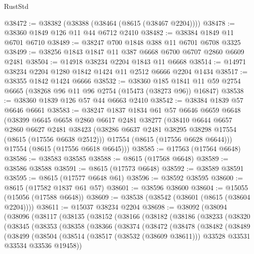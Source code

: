 \begin{lexlean}{RustStd}
\begin{coremodule}
@38472 := @38382 (@38388 (@38464 (@8615 (@38467 @2204))))
@38478 := @38360 @1849 @126 @11 @44 @6712 @2410
@38482 := @38384 @1849 @11 @6701 @6710
@38489 := @38247 @700 @1848 @388 @11 @6701 @6708 @3325
@38499 := @38256 @1843 @1847 @11 @387 @6668 @6700 @6707 @2860 @6609 @2481
@38504 := @14918 @38234 @2204 @1843 @11 @6668
@38514 := @14971 @38234 @2204 @1280 @1842 @1424 @11 @2512 @6666 @2204 @1434
@38517 := @38355 @1842 @1424 @6666
@38532 := @38360
    @185
    @1841
    @11
    @59
    @2754
    @6665
    (@38268 @96 @11 @96 @2754 (@15473 (@38273 @96)) @16847)
@38538 := @38360 @1839 @126 @57 @44 @6663 @2410
@38542 := @38384 @1839 @57 @6646 @6661
@38583 := @38247
    @1837
    @1834
    @61
    @57
    @6646
    @6659
    @6648
    (@38399
      @6645
      @6658
      @2860
      @6617
      @2481
      @38277
      (@38410
        @6644
        @6657
        @2860
        @6627
        @2481
        @38423
        (@38286 @6637 @2481 @38295 @38298 @17554 (@8615 (@17556 @6638 @2512)))
        @17554
        (@8615 (@17556 @6628 @6644)))
      @17554
      (@8615 (@17556 @6618 @6645)))
@38585 := @17563 (@17564 @6648)
@38586 := @38583 @38585
@38588 := @8615 (@17568 @6648)
@38589 := @38586 @38588
@38591 := @8615 (@17573 @6648)
@38592 := @38589 @38591
@38595 := @8615 (@17577 @6648 @61)
@38596 := @38592 @38595
@38600 := @8615 (@17582 @1837 @61 @57)
@38601 := @38596 @38600
@38604 := @15055 (@15056 (@17588 @6648))
@38609 := @38538 (@38542 (@38601 (@8615 (@38604 @2204))))
@38611 := @15037 @38234 @2204
@38698 := @38092
    (@38094
      (@38096
        (@38117
          (@38135
            (@38152
              (@38166
                (@38182
                  (@38186
                    (@38233
                      (@38320
                        (@38345
                          (@38353
                            (@38358
                              (@38366
                                (@38374
                                  (@38472
                                    (@38478
                                      (@38482
                                        (@38489
                                          (@38499
                                            (@38504
                                              (@38514
                                                (@38517 (@38532 (@38609 @38611)))
                                                @33528
                                                @33531
                                                @33534
                                                @33536
                                                @19458))

\end{coremodule}
\end{lexlean}
